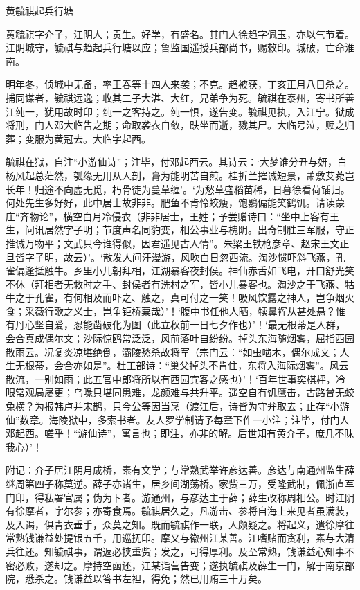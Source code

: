 \documentclass[]{article}
\begin{document}
黄毓祺起兵行塘

黄毓祺字介子，江阴人；贡生。好学，有盛名。其门人徐趋字佩玉，亦以气节着。江阴城守，毓祺与趋起兵行塘以应；鲁监国遥授兵部尚书，赐敕印。城破，亡命淮南。

明年冬，侦城中无备，率王春等十四人来袭；不克。趋被获，丁亥正月八日杀之。捕同谋者，毓祺远逸；收其二子大湛、大红，兄弟争为死。毓祺在泰州，寄书所善江纯一，犹用故时印；纯一之客持之。纯一惧，遂告变。毓祺见执，入江宁。狱成将刑，门人邓大临告之期；命取袭衣自敛，趺坐而逝，戮其尸。大临号泣，赎之归葬；变服为黄冠去。大临字起西。

毓祺在狱，自注``小游仙诗''；注毕，付邓起西云。其诗云：`大梦谁分丑与妍，白杨风起总茫然，瓠缘无用从人剖，膏为能明苦自煎。桂折兰摧诚短景，萧敷艾菀岂长年！归途不向虚无觅，朽骨徒为蔓草缠'。`为愁草盛稻苗稀，日暮徐看荷锸归。何处先生多好好，此中居士故非非。肥鱼不肯怜蛟瘦，饱鷃偏能笑鹤饥。请读蒙庄``齐物论''，横空白月冷侵衣（非非居士，王姓；予尝赠诗曰：``坐中上客有王生，问讯居然字子明；节度声名同豹变，相公事业与槐阴。出奇制胜三军服，守正推诚万物平；文武只今谁得似，因君遥见古人情''。朱梁王铁枪彦章、赵宋王文正旦皆字子明，故云）'。`散发人间汗漫游，风吹白日忽西流。淘沙惯吓斜飞燕，孔雀偏逢抵触牛。乡里小儿朝拜相，江湖暴客夜封侯。神仙赤舌如飞电，开口舒光笑不休（拜相者无救时之手、封侯者有洗村之军，皆小儿暴客也。淘沙之于飞燕、牯牛之于孔雀，有何相及而吓之、触之，真可付之一笑！吸风饮露之神人，岂争烟火食；采薇行歌之义士，岂争钜桥粟哉）'！`腹中书任他人晒，犊鼻裈从甚处悬？惟有丹心坚自爱，忍能凿破化为图（此立秋前一日七夕作也）'！`最无根蒂是人群，会合真成偶尔文；沙际惊鸥常泛泛，风前落叶自纷纷。掉头东海随烟雾，屈指西园散雨云。况复炎凉堪绝倒，灞陵愁杀故将军（宗门云：``如虫啮木，偶尔成文；人生无根蒂，会合亦如是''。杜工部诗：``巢父掉头不肯住，东将入海际烟雾''。风云散流，一别如雨；此五官中郎将所以有西园宾客之感也）'！`百年世事奕棋枰，冷眼常观局屡更；乌喙只堪同患难，龙颜难与共升平。遥空自有饥鹰击，古路曾无蛟兔横？为报韩卢并宋鹊，只今公等因当烹（渡江后，诗皆为守弁取去；止存``小游仙''数章。海陵狱中，多索书者。友人罗学制请予每章下作一小注；注毕，付门人邓起西。嗟乎！``游仙诗''，寓言也；即注，亦非的解。后世知有黄介子，庶几不昧我心）'！

附记：介子居江阴月成桥，素有文学；与常熟武举许彦达善。彦达与南通州监生薛继周第四子称莫逆。薛子亦诸生，居乡间湖荡桥。家赀三万，受隆武制，佩浙直军门印，得私署官属；伪为卜者。游通州，与彦达主于薛；薛生改称周相公。时江阴有徐摩者，字尔参；亦寄食焉。毓祺居久之，凡游击、参将自海上来见者虽满装，及入谒，俱青衣垂手，众莫之知。既而毓祺作一联，人颇疑之。将起义，遣徐摩往常熟钱谦益处提银五千，用巡抚印。摩又与徽州江某善。江嗜赌而贪利，素与大清兵往还。知毓祺事，谓返必挟重赀；发之，可得厚利。及至常熟，钱谦益心知事不密必败，遂却之。摩持空函还，江某诣营告变；遂执毓祺及薜生一门，解于南京部院，悉杀之。钱谦益以答书左袒，得免；然已用贿三十万矣。
\end{document}
